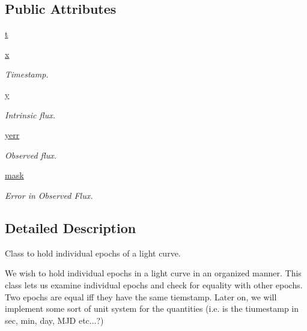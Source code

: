 \subsection*{Public Attributes}
\begin{DoxyCompactItemize}
\item 
\hyperlink{classpython_1_1libcarma_1_1libcarma_1_1epoch_adc45927ca28d3e686fc64dccbe46be0a}{t}
\item 
\hyperlink{classpython_1_1libcarma_1_1libcarma_1_1epoch_a438579d7a539c50c10f23945f3f61c24}{x}
\begin{DoxyCompactList}\small\item\em Timestamp. \end{DoxyCompactList}\item 
\hyperlink{classpython_1_1libcarma_1_1libcarma_1_1epoch_a61f3231c84360ba42ed61c0fb8952262}{y}
\begin{DoxyCompactList}\small\item\em Intrinsic flux. \end{DoxyCompactList}\item 
\hyperlink{classpython_1_1libcarma_1_1libcarma_1_1epoch_a5938ef62a82d0261aad38ddb182e0b9a}{yerr}
\begin{DoxyCompactList}\small\item\em Observed flux. \end{DoxyCompactList}\item 
\hyperlink{classpython_1_1libcarma_1_1libcarma_1_1epoch_a045122b8c088225f00b0052f183aac3a}{mask}
\begin{DoxyCompactList}\small\item\em Error in Observed Flux. \end{DoxyCompactList}\end{DoxyCompactItemize}


\subsection{Detailed Description}
Class to hold individual epochs of a light curve. 

\label{classpython_1_1libcarma_1_1libcarma_1_1epoch_epoch_}%
\hypertarget{classpython_1_1libcarma_1_1libcarma_1_1epoch_epoch_}{}%
 We wish to hold individual epochs in a light curve in an organized manner. This class lets us examine individual epochs and check for equality with other epochs. Two epochs are equal iff they have the same tiemstamp. Later on, we will implement some sort of unit system for the quantities (i.\-e. is the tiumestamp in sec, min, day, M\-J\-D etc...?) 

